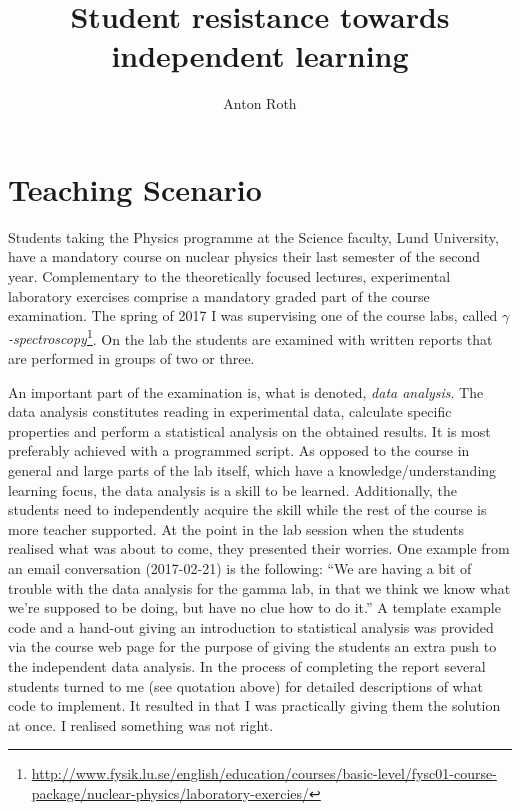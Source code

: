 \documentclass[]{article}
\title{Student resistance towards independent learning}
\author{Anton Roth}
\begin{document}

\section*{Teaching Scenario}
Students taking the Physics programme at the Science faculty, Lund University, have a mandatory course on nuclear physics their last semester of the second year.
Complementary to the theoretically focused lectures, experimental laboratory exercises comprise a mandatory graded part of the course examination.
The spring of 2017 I was supervising one of the course labs, called {\it $\gamma$-spectroscopy}\footnote{\url{http://www.fysik.lu.se/english/education/courses/basic-level/fysc01-course-package/nuclear-physics/laboratory-exercies/}}.
On the lab the students are examined with written reports that are performed in groups of two or three.

An important part of the examination is, what is denoted, {\it data analysis}.
The data analysis constitutes reading in experimental data, calculate specific properties and perform a statistical analysis on the obtained results.
It is most preferably achieved with a programmed script.
As opposed to the course in general and large parts of the lab itself, which have a knowledge/understanding learning focus, the data analysis is a skill to be learned.
Additionally, the students need to independently acquire the skill while the rest of the course is more teacher supported.
At the point in the lab session when the students realised what was about to come, they presented their worries.
One example from an email conversation (2017-02-21) is the following: ``We are having a bit of trouble with the data analysis for the gamma lab, in that we think we know what we're supposed to be doing, but have no clue how to do it.''
A template example code and a hand-out giving an introduction to statistical analysis was provided via the course web page for the purpose of giving the students an extra push to the independent data analysis.
In the process of completing the report several students turned to me (see quotation above) for detailed descriptions of what code to implement.
It resulted in that I was practically giving them the solution at once.
I realised something was not right.
\end{document}

